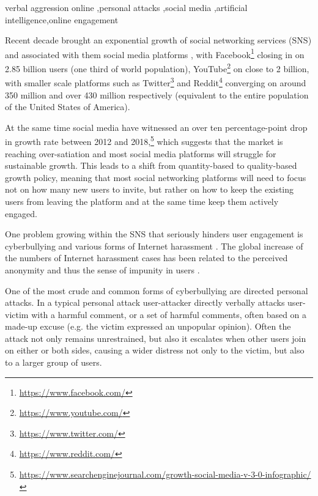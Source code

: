 \documentclass[a4paper,fleqn]{cas-dc}
\begin{document}
\begin{keywords}
 verbal aggression online \sep personal attacks \sep social media \sep artificial intelligence\sep online engagement
\end{keywords}

\maketitle




Recent decade brought an exponential growth of social networking services (SNS) and associated with them social media platforms \citep{ortiz2019rise,sheth2020borderless},
 with Facebook\footnote{\url{https://www.facebook.com/}} closing in on 2.85 billion users (one third of world population), YouTube\footnote{\url{https://www.youtube.com/}} on close to 2 billion, with smaller scale platforms such as Twitter\footnote{\url{https://www.twitter.com/}} and Reddit\footnote{\url{https://www.reddit.com/}} converging on around 350 million and over 430 million respectively (equivalent to the entire population of the United States of America). 

At the same time social media have witnessed an over ten percentage-point drop in growth rate between 2012 and 2018,\footnote{\url{https://www.searchenginejournal.com/growth-social-media-v-3-0-infographic/}} which suggests that the market is reaching over-satiation \citep{andersen2001satiation}  and most social media platforms will struggle for sustainable growth.
This leads to a shift from quantity-based to quality-based growth policy, meaning that most social networking platforms will need to focus not on how many new users to invite, but rather on how to keep the existing users from leaving the platform and at the same time keep them actively engaged.

One problem growing within the SNS that  seriously hinders user engagement is  cyberbullying and various forms of Internet harassment \citep{ptaszynski2018automatic}. The global increase of the numbers of Internet harassment cases has been related to the perceived anonymity and thus the sense of impunity in users 
\citep{barlett2015anonymously,barlett2016predicting}. 

One of the most crude and common forms of cyberbullying are directed personal attacks. In a typical personal attack user-attacker directly verbally attacks user-victim with a harmful comment, or a set of harmful comments, often based on a made-up excuse (e.g. the victim expressed an unpopular opinion). Often the attack not only remains unrestrained, but also it escalates when other users join on either or both sides, causing a wider distress not only to the victim, but also to a larger group of users. 
\end{document}

